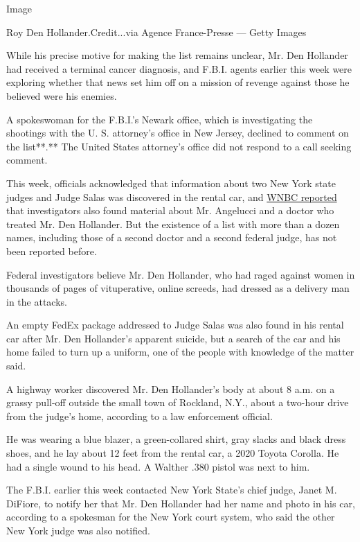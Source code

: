 Image

Roy Den Hollander.Credit...via Agence France-Presse --- Getty Images

While his precise motive for making the list remains unclear, Mr. Den
Hollander had received a terminal cancer diagnosis, and F.B.I. agents
earlier this week were exploring whether that news set him off on a
mission of revenge against those he believed were his enemies.

A spokeswoman for the F.B.I.'s Newark office, which is investigating the
shootings with the U. S. attorney's office in New Jersey, declined to
comment on the list**.** The United States attorney's office did not
respond to a call seeking comment.

This week, officials acknowledged that information about two New York
state judges and Judge Salas was discovered in the rental car, and
\href{https://www.nbcnewyork.com/news/local/crime-and-courts/fbi-says-it-has-evidence-linking-nj-judge-family-shooting-suspect-to-calif-murder/2526223/}{WNBC
reported} that investigators also found material about Mr. Angelucci and
a doctor who treated Mr. Den Hollander. But the existence of a list with
more than a dozen names, including those of a second doctor and a second
federal judge, has not been reported before.

Federal investigators believe Mr. Den Hollander, who had raged against
women in thousands of pages of vituperative, online screeds, had dressed
as a delivery man in the attacks.

An empty FedEx package addressed to Judge Salas was also found in his
rental car after Mr. Den Hollander's apparent suicide, but a search of
the car and his home failed to turn up a uniform, one of the people with
knowledge of the matter said.

A highway worker discovered Mr. Den Hollander's body at about 8 a.m. on
a grassy pull-off outside the small town of Rockland, N.Y., about a
two-hour drive from the judge's home, according to a law enforcement
official.

He was wearing a blue blazer, a green-collared shirt, gray slacks and
black dress shoes, and he lay about 12 feet from the rental car, a 2020
Toyota Corolla. He had a single wound to his head. A Walther .380 pistol
was next to him.

The F.B.I. earlier this week contacted New York State's chief judge,
Janet M. DiFiore, to notify her that Mr. Den Hollander had her name and
photo in his car, according to a spokesman for the New York court
system, who said the other New York judge was also notified.

